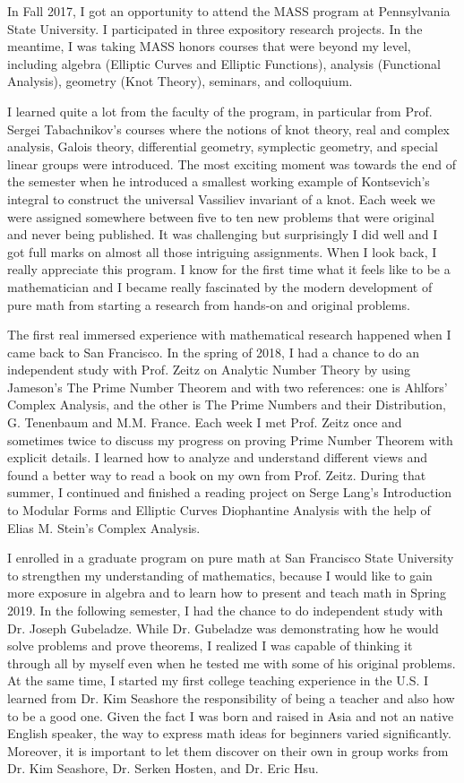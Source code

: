 \documentclass[11pt]{amsart}
\begin{document}
In Fall 2017, I got an opportunity to attend the MASS program at Pennsylvania State University. I participated in three expository research projects. In the meantime, I was taking MASS honors courses that were beyond my level, including algebra (Elliptic Curves and Elliptic Functions), analysis (Functional Analysis), geometry (Knot Theory), seminars, and colloquium.

I learned quite a lot from the faculty of the program, in particular from Prof. Sergei Tabachnikov’s courses where the notions of knot theory, real and complex analysis, Galois theory, differential geometry, symplectic geometry, and special linear groups were introduced. The most exciting moment was towards the end of the semester when he introduced a smallest working example of Kontsevich’s integral to construct the universal Vassiliev invariant of a knot. Each week we were assigned somewhere between five to ten new problems that were original and never being published. It was challenging but surprisingly I did well and I got full marks on almost all those intriguing assignments. When I look back, I really appreciate this program. I know for the first time what it feels like to be a mathematician and I became really fascinated by the modern development of pure math from starting a research from hands-on and original problems.



The first real immersed experience with mathematical research happened when I came back to San Francisco. In the spring of 2018, I had a chance to do an independent study with Prof. Zeitz on Analytic Number Theory by using Jameson’s The Prime Number Theorem and with two references: one is Ahlfors’ Complex Analysis, and the other is The Prime Numbers and their Distribution, G. Tenenbaum and M.M. France. Each week I met Prof. Zeitz once and sometimes twice to discuss my progress on proving Prime Number Theorem with explicit details. I learned how to analyze and understand different views and found a better way to read a book on my own from Prof. Zeitz. During that summer, I continued and finished a reading project on Serge Lang’s Introduction to Modular Forms and Elliptic Curves Diophantine Analysis with the help of Elias M. Stein’s Complex Analysis.

I enrolled in a graduate program on pure math at San Francisco State University to strengthen my understanding of mathematics, because I would like to gain more exposure in algebra and to learn how to present and teach math in Spring 2019. In the following semester, I had the chance to do independent study with Dr. Joseph Gubeladze. While Dr. Gubeladze was demonstrating how he would solve problems and prove theorems, I realized I was capable of thinking it through all by myself even when he tested me with some of his original problems. At the same time, I started my first college teaching experience in the U.S. I learned from Dr. Kim Seashore the responsibility of being a teacher and also how to be a good one. Given the fact I was born and raised in Asia and not an native English speaker, the way to express math ideas for beginners varied significantly. Moreover, it is important to let them discover on their own in group works from Dr. Kim Seashore, Dr. Serken Hosten, and Dr. Eric Hsu.
\end{document}
